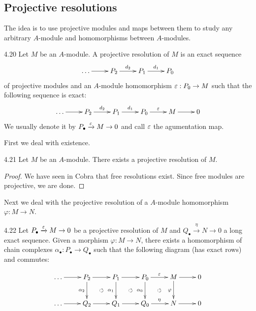 \documentclass[twoside = false,	%
		headsepline,		%
		parskip = true,
		]{scrbook}						%
\begin{document}
\subsection{Projective resolutions}
    The idea is to use projective modules and maps between them to study any arbitrary $A$-module and homomorphisms  between $A$-modules.

    \begin{definition}{}{4.20}
        Let $M$ be an $A$-module. A projective resolution of $M$ is an exact sequence
        \begin{equation*}
            \xymatrix{
                \dots \ar[r] & P_2 \ar[r]^{d_2} & P_1 \ar[r]^{d_1} & P_0 
            }
        \end{equation*}
        of projective modules and an $A$-module homomorphism $\varepsilon: P_0 \to M$ such that the following sequence is exact:
        \begin{equation*}
        \xymatrix {
            \dots \ar[r] & P_2 \ar[r]^{d_2} & P_1 \ar[r]^{d_1} & P_0 \ar[r]^{\e} & M \ar[r] & 0
        }
        \end{equation*}
        We usually denote it by $P_\bullet \xrightarrow{\varepsilon} M \to 0$ and call $\varepsilon$ the agumentation map.
    \end{definition}

    First we deal with existence.

    \begin{lemma}{}{4.21}
        Let $M$ be an $A$-module. There exists a projective resolution of $M$.
    \end{lemma}

    \begin{proof}
        We have seen in Cobra \cite{Cobra} that free resolutions exist. Since free modules are projective, we are done.
    \end{proof}

    Next we deal with the projective resolution of a $A$-module homomorphism $\varphi: M \to N$.

    \begin{proposition}{}{4.22}
        Let $P_\bullet \xrightarrow{\varepsilon} M \to 0$ be a projective resolution of $M$ and $Q_\bullet \xrightarrow{\eta} N \to 0$ a long exact sequence. Given a morphism $\varphi: M \to N$, there exists a homomorphism of chain complexes $\alpha_\bullet: P_\bullet \to Q_\bullet$ such that the following diagram (has exact rows) and commutes:

        \begin{equation*}
            \xymatrix {
                \dots \ar[r] & P_2 \ar[r] \ar[d]_{\alpha_2} & P_1 \ar[r] \ar[d]_{\alpha_1} & P_0 \ar[r]^{\e} \ar[d]_{\alpha_0}& M \ar[r] \ar[d]_{\varphi} & 0 \\
                \dots \ar[r] & Q_2 \ar[r] \ar@{}[ur]|{\circlearrowleft} & Q_1 \ar[r] \ar@{}[ur]|{\circlearrowleft} & Q_0 \ar[r]^{\eta} \ar@{}[ur]|{\circlearrowleft} & N \ar[r] & 0
            }
        \end{equation*}
    \end{proposition}
\end{document}
